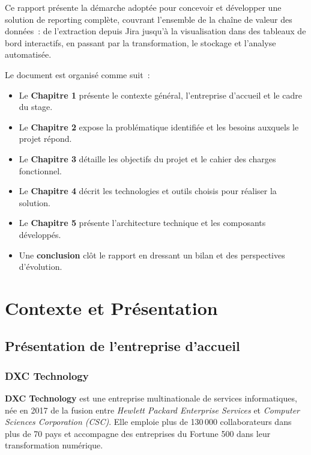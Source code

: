 \documentclass[12pt, a4paper]{report}
\begin{document}
Ce rapport présente la démarche adoptée pour concevoir et développer une solution de reporting complète, couvrant l'ensemble de la chaîne de valeur des données~: de l'extraction depuis Jira jusqu'à la visualisation dans des tableaux de bord interactifs, en passant par la transformation, le stockage et l'analyse automatisée.

Le document est organisé comme suit~:
\begin{itemize}[leftmargin=2em]
    \item Le \textbf{Chapitre 1} présente le contexte général, l'entreprise d'accueil et le cadre du stage.
    \item Le \textbf{Chapitre 2} expose la problématique identifiée et les besoins auxquels le projet répond.
    \item Le \textbf{Chapitre 3} détaille les objectifs du projet et le cahier des charges fonctionnel.
    \item Le \textbf{Chapitre 4} décrit les technologies et outils choisis pour réaliser la solution.
    \item Le \textbf{Chapitre 5} présente l'architecture technique et les composants développés.
    \item Une \textbf{conclusion} clôt le rapport en dressant un bilan et des perspectives d'évolution.
\end{itemize}

\chapter{Contexte et Présentation}

\section{Présentation de l'entreprise d'accueil}

\subsection{DXC Technology}

\textbf{DXC Technology} est une entreprise multinationale de services informatiques, née en 2017 de la fusion entre \textit{Hewlett Packard Enterprise Services} et \textit{Computer Sciences Corporation (CSC)}. Elle emploie plus de 130\,000 collaborateurs dans plus de 70 pays et accompagne des entreprises du Fortune 500 dans leur transformation numérique.
\end{document}

